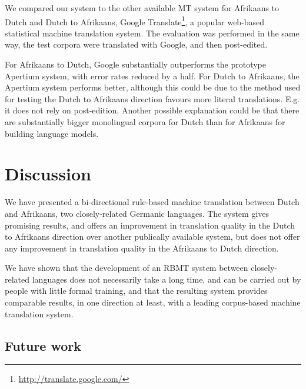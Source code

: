 \documentclass[11pt]{article}
\begin{document}
We compared our system to the other available MT system for Afrikaans to Dutch and Dutch to Afrikaans, 
Google Translate\footnote{\url{http://translate.google.com/}}, a popular web-based statistical machine
translation system. The evaluation was performed in the same way, the test corpora were translated with 
Google, and then post-edited.

For Afrikaans to Dutch, Google substantially outperforms the prototype Apertium system, with error rates 
reduced by a half. For Dutch to Afrikaans, the Apertium system performs better, although this could 
be due to the method used for testing the Dutch to Afrikaans direction favours more literal translations. E.g. 
it does not rely on post-edition. Another possible explanation could be that there are substantially bigger
monolingual corpora for Dutch than for Afrikaans for building language models.



\section{Discussion}

We have presented a bi-directional rule-based machine translation between Dutch and Afrikaans, 
two closely-related Germanic languages. The system gives promising results, and offers an improvement
in translation quality in the Dutch to Afrikaans direction over another publically available system, 
but does not offer any improvement in translation quality in the Afrikaans to Dutch direction.

We have shown that the development of an RBMT system between closely-related languages does not
necessarily take a long time, and can be carried out by people with little formal training, and that
the resulting system provides comparable results, in one direction at least, with a leading 
corpus-based machine translation system.

\subsection{Future work}
\end{document}
